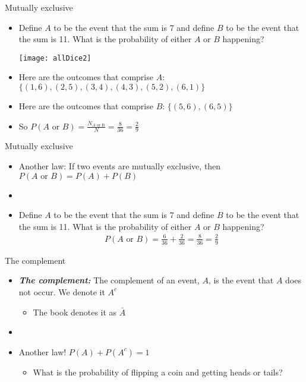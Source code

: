 \documentclass[xcolor=dvipsnames]{beamer}
\begin{document}
\begin{frame}{Mutually exclusive}
	\begin{itemize}
		\item Define $A$ to be the event that the sum is 7 and define $B$ to be the event that the sum is 11. What is the probability of either $A$ or $B$ happening? \pause
		\begin{center}
			\texttt{[image: allDice2]}
		\end{center}
		\item Here are the outcomes that comprise $A$: $\{(1,6), (2,5), (3,4), (4,3), (5,2), (6,1)\}$ \pause
		\item Here are the outcomes that comprise $B$: $\{(5,6), (6,5)\}$ \pause
		\item So $P(A \text{ or } B) = \frac{N_{A\text{ or B}}}{N} = \frac{8}{36} = \frac{2}{9}$
	\end{itemize}
\end{frame}

\begin{frame}{Mutually exclusive}
\begin{itemize}
	\item Another law: If two events are mutually exclusive, then $P(A \text{ or } B) = P(A) + P(B)$ \pause
	\item[]
	\item Define $A$ to be the event that the sum is 7 and define $B$ to be the event that the sum is 11. What is the probability of either $A$ or $B$ happening? \pause
	\begin{gather*}
		P(A \text{ or } B) = \frac{6}{36} + \frac{2}{36} = \frac{8}{36} = \frac{2}{9}
	\end{gather*}
\end{itemize}
\end{frame}

\begin{frame}{The complement}
	\begin{itemize}
		\item \textbf{\emph{The complement:}} The complement of an event, $A$, is the event that $A$ does not occur. We denote it $A^c$ \pause
		\begin{itemize}
			\item The book denotes it as $\bar{A}$ \pause
		\end{itemize}
	\item[]
	\item Another law! $P(A) + P(A^c) = 1$ \pause
	\begin{itemize}
		\item What is the probability of flipping a coin and getting heads or tails?
	\end{itemize}
	\end{itemize}
\end{frame}
\end{document}
